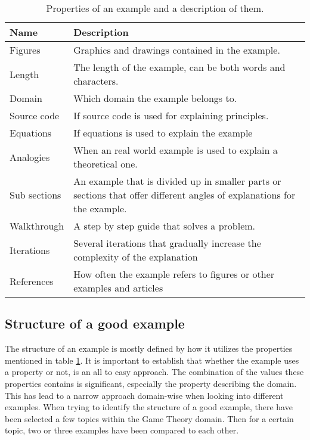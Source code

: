 \begin{table}[h!]
\centering
\begin{tabular} {|| p{5em} | p{23em} ||} 
 \hline
 Name & Description \\ [0.5ex] 
 \hline\hline
 Figures & Graphics and drawings contained in the example. \\ 
 Length & The length of the example, can be both words and characters. \\
 Domain & Which domain the example belongs to. \\
 Source code & If source code is used for explaining principles. \\
 Equations & If equations is used to explain the example \\
 Analogies & When an real world example is used to explain a theoretical one. \\
 Sub sections & An example that is divided up in smaller parts or sections that offer different angles of explanations for the example. \\
 Walkthrough & A step by step guide that solves a problem. \\
 Iterations & Several iterations that gradually increase the complexity of the explanation \\
 References & How often the example refers to figures or other examples and articles \\ [1ex] 
 \hline
\end{tabular}
\caption{Properties of an example and a description of them.}
\label{table:1}
\end{table}


\subsection{Structure of a good example} \label{good_example}

The structure of an example is mostly defined by how it utilizes the properties mentioned in table \ref{table:1}. It is important to establish that whether the example uses a property or not, is an all to easy approach. The combination of the values these properties contains is significant, especially the property describing the domain. This has lead to a narrow approach domain-wise when looking into different examples.
When trying to identify the structure of a good example, there have been selected a few topics within the Game Theory domain. Then for a certain topic, two or three examples have been compared to each other.  

